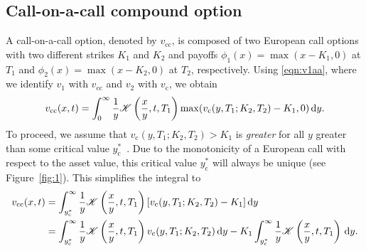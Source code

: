 \subsection{Call-on-a-call compound option}
A call-on-a-call option, denoted by $v_{\text{cc}}$, is composed of two European call options with two different strikes $K_1$ and $K_2$ and payoffs $\phi_1(x) = \max(x - K_1, 0)$ at $T_1$ and $\phi_2(x) = \max(x - K_2, 0)$ at $T_2$, respectively. Using \eqref{eqn:v1aa}, where we identify $v_1$ with $v_\mathrm{cc}$ and $v_2$ with $v_\mathrm{c}$, we obtain
	\begin{equation*}
		v_{\text{cc}}(x,t) = \int_0^\infty \frac{1}{y} \mathscr K\left( \frac{x}{y}, t, T_1 \right)\max(v_\text{c}(y,T_1; K_2, T_2) - K_1, 0)\, \mathrm d y.
	\end{equation*}
To proceed, we assume that $v_{\text{c}}(y,T_1; K_2, T_2) > K_1$ is \emph{greater} for all $y$ greater than some critical value $y_\mathrm{c}^*$~\cite{Kwok2008}. Due to the monotonicity of a European call with respect to the asset value, this critical value $y_\mathrm{c}^*$ will always be unique (see Figure~\ref{fig:1}). This simplifies the integral to
	\begin{align*}
		v_{\text{cc}}(x,t) &= \int_{y_\mathrm{c}^*}^\infty \frac{1}{y}\mathscr K\left( \frac{x}{y}, t, T_1 \right)[v_\text{c}(y,T_1; K_2, T_2) - K_1] \, \mathrm d y \\
		&= \int_{y_\mathrm{c}^*}^\infty \frac{1}{y} \mathscr K\left( \frac{x}{y}, t, T_1 \right)v_\text{c}(y,T_1; K_2, T_2) \, \mathrm d y - K_1\int_{y_\mathrm{c}^*}^\infty \frac{1}{y}\mathscr K\left( \frac{x}{y}, t, T_1 \right) \, \mathrm d y.
	\end{align*}

